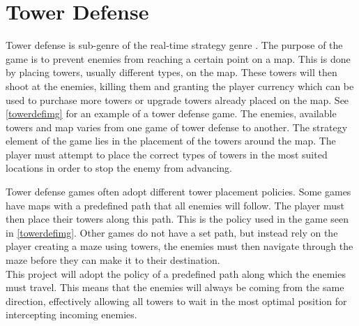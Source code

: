 \section{Tower Defense}\label{sec:towerdef}
Tower defense is sub-genre of the real-time strategy genre \cite{td1}. The purpose of the game is to prevent enemies from reaching a certain point on a map. This is done by placing towers, usually different types, on the map. These towers will then shoot at the enemies, killing them and granting the player currency which can be used to purchase more towers or upgrade towers already placed on the map. See \cref{towerdefimg} for an example of a tower defense game. The enemies, available towers and map varies from one game of tower defense to another. The strategy element of the game lies in the placement of the towers around the map. The player must attempt to place the correct types of towers in the most suited locations in order to stop the enemy from advancing. 


Tower defense games often adopt different tower placement policies. Some games have maps with a predefined path that all enemies will follow. The player must then place their towers along this path. This is the policy used in the game seen in \cref{towerdefimg}. Other games do not have a set path, but instead rely on the player creating a maze using towers, the enemies must then navigate through the maze before they can make it to their destination. \\

This project will adopt the policy of a predefined path along which the enemies must travel. This means that the enemies will always be coming from the same direction, effectively allowing all towers to wait in the most optimal position for intercepting incoming enemies.

